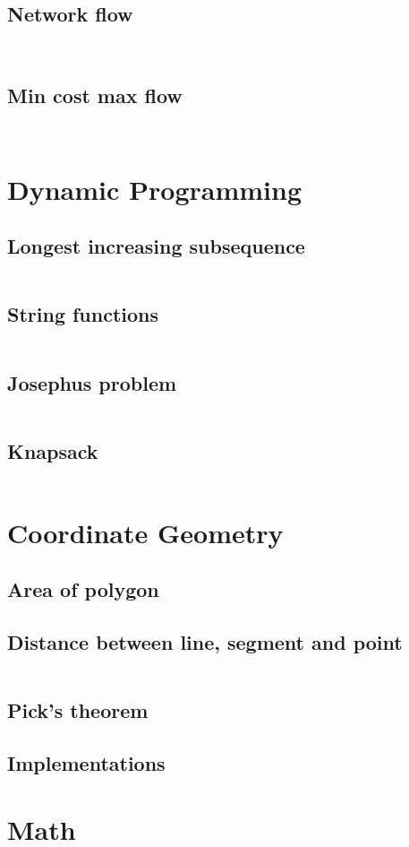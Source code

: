 \documentclass[8pt,a4paper,landscape,oneside]{amsart}
\newcommand{\codej}[1]{\inputminted[fontsize=\large,tabsize=2,baselinestretch=1]{java}{#1}}
\newcommand{\codep}[1]{\inputminted[fontsize=\large,tabsize=2,baselinestretch=1]{py}{#1}}
\begin{document}
\begin{multicols*}{2}
\begin{large}
\subsection{Network flow}
\codep{maxflow.py}
\codep{maxflow2.py}
\subsection{Min cost max flow}
\codep{mincostmaxflow.py}
\codej{mincostmaxflow.java}
\section{Dynamic Programming}
\subsection{Longest increasing subsequence}
\codep{lis.py}
\subsection{String functions}
\codep{stringmatching.py}
\subsection{Josephus problem}
\codep{josephus.py}
\subsection{Knapsack}
\codep{knapsack.py}
\section{Coordinate Geometry}
\subsection{Area of polygon}
\subsection{Distance between line, segment and point}
\codep{linesegdist.py}
\subsection{Pick's theorem}
\subsection{Implementations}
\section{Math}

\end{large}
\end{multicols*}
\end{document}
